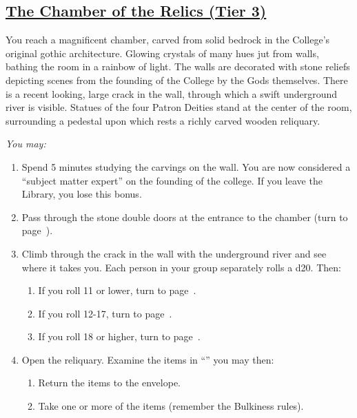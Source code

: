 \documentclass[sheet]{GL2020}
\begin{document}
\begin{center}\section*{\underline{The Chamber of the Relics (Tier 3)}}\end{center}
\label{ChamberofRelics}

You reach a magnificent chamber, carved from solid bedrock in the College’s original gothic architecture. Glowing crystals of many hues jut from walls, bathing the room in a rainbow of light. The walls are decorated with stone reliefs depicting scenes from the founding of the College by the Gods themselves. There is a recent looking, large crack in the wall, through which a swift underground river is visible. Statues of the four Patron Deities stand at the center of the room, surrounding a pedestal upon which rests a richly carved wooden reliquary. 

\vspace{0.5cm}

\begingroup
\itshape
You may:
\begin{enumerate}[A]
  \item Spend 5 minutes studying the carvings on the wall. You are now considered a ``subject matter expert'' on the founding of the college. If you leave the Library, you lose this bonus. 
	\item Pass through the stone double doors at the entrance to the chamber (turn to page~\pageref{HallofHeadlesssGuardians}).
	\item Climb through the crack in the wall with the underground river and see where it takes you. Each person in your group separately rolls a d20. Then:
	\begin{enumerate}
		\item If you roll 11 or lower, turn to page~\pageref{WetandBumpyRide}.
		\item If you roll 12-17, turn to page~\pageref{UndergroundRiver}.
		\item If you roll 18 or higher, turn to page~\pageref{RiverofForgetting}.
	\end{enumerate}
	\item Open the reliquary. Examine the items in ``\sReliquaryEnvelope{}'' you may then:
	\begin{enumerate}
		\item Return the items to the envelope.
		\item Take one or more of the items (remember the Bulkiness rules).
	\end{enumerate}
\end{enumerate}
\endgroup
\end{document}
